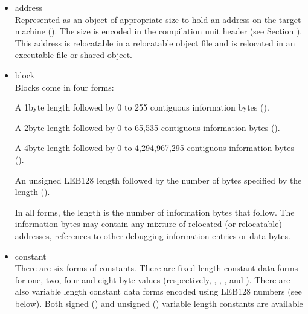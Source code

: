 \begin{itemize}
\item address \\
Represented as an object of appropriate size to hold an
address on the target machine 
(). The size is
encoded in the compilation unit header 
(see Section ).
This address is relocatable in a relocatable object file and
is relocated in an executable file or shared object.

\item block \\
Blocks come in four forms:

\begin{myindentpara}{1cm}
A 1\dash byte length followed by 0 to 255 contiguous information
bytes ().
\end{myindentpara}

\begin{myindentpara}{1cm}
A 2\dash byte length followed by 0 to 65,535 contiguous information
bytes ().
\end{myindentpara}


\begin{myindentpara}{1cm}
A 4\dash byte length followed by 0 to 4,294,967,295 contiguous
information bytes ().
\end{myindentpara}


\begin{myindentpara}{1cm}
An unsigned LEB128 length followed by the number of bytes
specified by the length ().
\end{myindentpara}

In all forms, the length is the number of information bytes
that follow. The information bytes may contain any mixture
of relocated (or relocatable) addresses, references to other
debugging information entries or data bytes.

\item constant \\
There are six forms of constants. There are fixed length
constant data forms for one, two, four and eight byte values
(respectively, 
, 
, 
,
and ). 
There are also variable length constant
data forms encoded using LEB128 numbers (see below). Both
signed () and unsigned 
() variable
length constants are available


\end{itemize}
